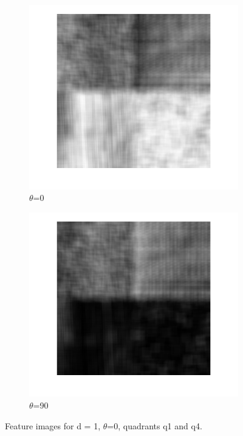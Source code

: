 \documentclass[a4paper, article, oneside, UKenglish]{memoir}
\newcommand{\0}{\mathbf{0}}
\newcommand{\1}{\mathbf{1}}
\begin{document}
\begin{figure}[h]
  \centering
  \begin{subfigure}[b]{0.45\linewidth}
    \includegraphics[width=\linewidth]{./images/fi1.png}
    \caption{$\theta$=0}
  \end{subfigure}
  \begin{subfigure}[b]{0.45\linewidth}
    \includegraphics[width=\linewidth]{./images/fi2.png}
    \caption{$\theta$=90}
  \end{subfigure}
  \caption{Feature images for d = 1, $\theta$=0, quadrants q1 and q4.}
  \label{fig:fi0}
\end{figure}
\end{document}
